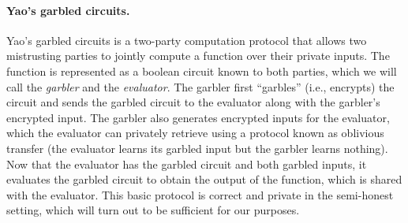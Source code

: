 \paragraph{Yao's garbled circuits.}
Yao's garbled circuits is a two-party computation protocol that allows two
mistrusting parties to jointly compute a function over their private inputs. The
function is represented as a boolean circuit known to both parties, which we
will call the \emph{garbler} and the \emph{evaluator}. The garbler first
``garbles'' (i.e., encrypts) the circuit and sends the garbled circuit to the
evaluator along with the garbler's encrypted input. The garbler also generates
encrypted inputs for the evaluator, which the evaluator can privately retrieve
using a protocol known as oblivious transfer (the evaluator learns its garbled
input but the garbler learns nothing). Now that the evaluator has the garbled
circuit and both garbled inputs, it evaluates the garbled circuit to obtain the
output of the function, which is shared with the evaluator. This basic protocol
is correct and private in the semi-honest setting, which will turn out to be
sufficient for our purposes.

